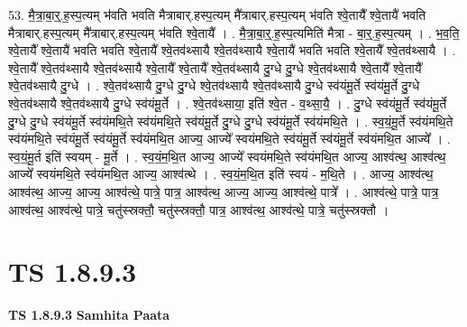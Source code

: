 \documentclass[17pt]{extarticle}
\begin{document}
53. मै॒त्रा॒बा॒र्॒.ह॒स्प॒त्यम् भ॑वति भवति मैत्राबार्.हस्प॒त्यम् मै᳚त्राबार्.हस्प॒त्यम् भ॑वति श्वे॒तायै᳚ श्वे॒तायै॑ भवति मैत्राबार्.हस्प॒त्यम् मै᳚त्राबार्.हस्प॒त्यम् भ॑वति श्वे॒तायै᳚ । . मै॒त्रा॒बा॒र्॒.ह॒स्प॒त्यमिति॑ मैत्रा - बा॒र्॒.ह॒स्प॒त्यम् । . भ॒व॒ति॒ श्वे॒तायै᳚ श्वे॒तायै॑ भवति भवति श्वे॒तायै᳚ श्वे॒तव॑थ्सायै श्वे॒तव॑थ्सायै श्वे॒तायै॑ भवति भवति श्वे॒तायै᳚ श्वे॒तव॑थ्सायै । . श्वे॒तायै᳚ श्वे॒तव॑थ्सायै श्वे॒तव॑थ्सायै श्वे॒तायै᳚ श्वे॒तायै᳚ श्वे॒तव॑थ्सायै दु॒ग्धे दु॒ग्धे श्वे॒तव॑थ्सायै श्वे॒तायै᳚ श्वे॒तायै᳚ श्वे॒तव॑थ्सायै दु॒ग्धे । . श्वे॒तव॑थ्सायै दु॒ग्धे दु॒ग्धे श्वे॒तव॑थ्सायै श्वे॒तव॑थ्सायै दु॒ग्धे स्व॑यंमू॒र्ते स्व॑यंमू॒र्ते दु॒ग्धे श्वे॒तव॑थ्सायै श्वे॒तव॑थ्सायै दु॒ग्धे स्व॑यंमू॒र्ते । . श्वे॒तव॑थ्साया॒ इति॑ श्वे॒त - व॒थ्सा॒यै॒ । . दु॒ग्धे स्व॑यंमू॒र्ते स्व॑यंमू॒र्ते दु॒ग्धे दु॒ग्धे स्व॑यंमू॒र्ते स्व॑यंमथि॒ते स्व॑यंमथि॒ते स्व॑यंमू॒र्ते दु॒ग्धे दु॒ग्धे स्व॑यंमू॒र्ते स्व॑यंमथि॒ते । . स्व॒यं॒मू॒र्ते स्व॑यंमथि॒ते स्व॑यंमथि॒ते स्व॑यंमू॒र्ते स्व॑यंमू॒र्ते स्व॑यंमथि॒त आज्य॒ आज्ये᳚ स्वयंमथि॒ते स्व॑यंमू॒र्ते स्व॑यंमू॒र्ते स्व॑यंमथि॒त आज्ये᳚ । . स्व॒यं॒मू॒र्त इति॑ स्वयम् - मू॒र्ते । . स्व॒यं॒म॒थि॒त आज्य॒ आज्ये᳚ स्वयंमथि॒ते स्व॑यंमथि॒त आज्य॒ आश्व॑त्थ॒ आश्व॑त्थ॒ आज्ये᳚ स्वयंमथि॒ते स्व॑यंमथि॒त आज्य॒ आश्व॑त्थे । . स्व॒यं॒म॒थि॒त इति॑ स्वयं - म॒थि॒ते । . आज्य॒ आश्व॑त्थ॒ आश्व॑त्थ॒ आज्य॒ आज्य॒ आश्व॑त्थे॒ पात्रे॒ पात्र॒ आश्व॑त्थ॒ आज्य॒ आज्य॒ आश्व॑त्थे॒ पात्रे᳚ । . आश्व॑त्थे॒ पात्रे॒ पात्र॒ आश्व॑त्थ॒ आश्व॑त्थे॒ पात्रे॒ चतु॑स्स्रक्तौ॒ चतु॑स्स्रक्तौ॒ पात्र॒ आश्व॑त्थ॒ आश्व॑त्थे॒ पात्रे॒ चतु॑स्स्रक्तौ । \newline
\pagebreak
{}
\section*{ TS 1.8.9.3 }

\textbf{TS 1.8.9.3 } \newline
\textbf{Samhita Paata} \newline
\end{document}
